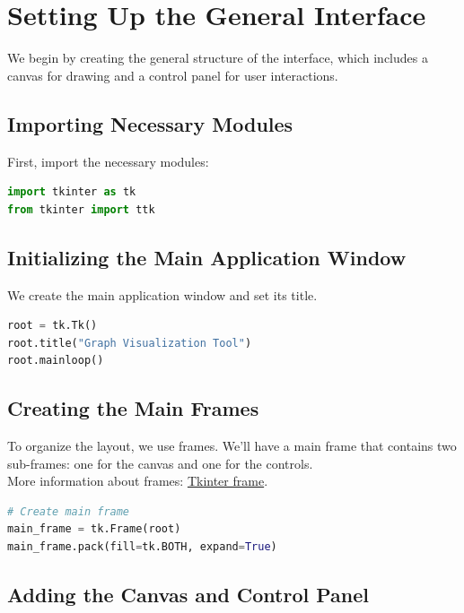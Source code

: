 \documentclass{article}
\begin{document}
\section{Setting Up the General Interface}

We begin by creating the general structure of the interface, which includes a canvas for drawing and a control panel for user interactions.

\subsection{Importing Necessary Modules}

First, import the necessary modules:

\begin{lstlisting}[language=Python]
import tkinter as tk
from tkinter import ttk
\end{lstlisting}

\subsection{Initializing the Main Application Window}

We create the main application window and set its title.

\begin{lstlisting}[language=Python]
root = tk.Tk()
root.title("Graph Visualization Tool")
root.mainloop()
\end{lstlisting}

\subsection{Creating the Main Frames}

To organize the layout, we use frames. We'll have a main frame that contains two sub-frames: one for the canvas and one for the controls. \\

More information about frames: \href{https://pythonbasics.org/tkinter-frame/}{Tkinter frame}.

\begin{lstlisting}[language=Python]
# Create main frame
main_frame = tk.Frame(root)
main_frame.pack(fill=tk.BOTH, expand=True)
\end{lstlisting}

\subsection{Adding the Canvas and Control Panel}
\end{document}
